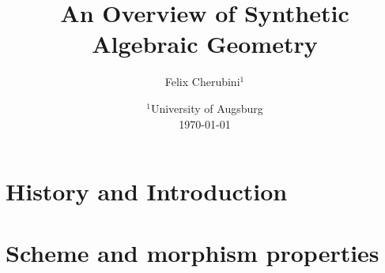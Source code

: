 \documentclass{../util/zariski}
\title{An Overview of Synthetic Algebraic Geometry}
\begin{document}
\author{Felix Cherubini$^1$}
\date{
  $^1$University of Augsburg \\[2ex]%
  \today
}

\maketitle



\section{History and Introduction}


\section{Scheme and morphism properties}


\printbibliography
\end{document}
